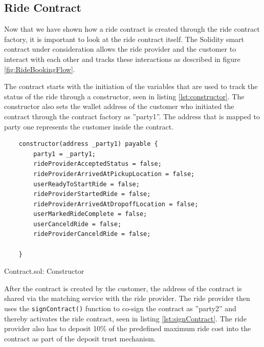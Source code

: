 \subsection{Ride Contract}
Now that we have shown how a ride contract is created through the ride contract factory, it is important to look at the ride contract itself. The Solidity smart contract under consideration allows the ride provider and the customer to interact with each other and tracks these interactions as described in figure \ref{fig:RideBookingFlow}.

The contract starts with the initiation of the variables that are used to track the status of the ride through a constructor, seen in listing \ref{lst:constructor}. The constructor also sets the wallet address of the customer who initiated the contract through the contract factory as ''party1''. The address that is mapped to party one represents the customer inside the contract.

\lstset{
  basicstyle=\footnotesize\ttfamily,
  breaklines=true,
  numbers=left,
  firstnumber=30
}

\begin{Listing}[H]
\begin{lstlisting}
    constructor(address _party1) payable {
        party1 = _party1;
        rideProviderAcceptedStatus = false;
        rideProviderArrivedAtPickupLocation = false;
        userReadyToStartRide = false;
        rideProviderStartedRide = false;
        rideProviderArrivedAtDropoffLocation = false;
        userMarkedRideComplete = false;
        userCanceldRide = false;
        rideProviderCanceldRide = false;

    }
\end{lstlisting}
  \caption{Contract.sol: Constructor}
  \label{lst:constructor}
\end{Listing}

After the contract is created by the customer, the address of the contract is shared via the matching service with the ride provider. The ride provider then uses the \texttt{signContract()} function to co-sign the contract as ''party2'' and thereby activates the ride contract, seen in listing \ref{lst:signContract}. The ride provider also has to deposit 10\% of the predefined  maximum ride cost into the contract as part of the deposit trust mechanism.

\lstset{
  basicstyle=\footnotesize\ttfamily,
  breaklines=true,
  numbers=left,
  firstnumber=76
}

